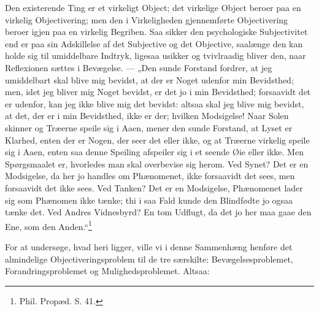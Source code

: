 \documentclass[11pt]{book}
\newcommand{\opage}[1]{\marginnote{\footnotesize\textit{[#1]}}}
\begin{document}
Den existerende Ting er et virkeligt Object; det virkelige Object
beroer paa en virkelig Objectivering; men den i Virkeligheden
gjennemførte Objectivering beroer igjen paa en virkelig Begriben. Saa
sikker den psychologiske Subjectivitet end er paa sin Adskillelse af
det Subjective og det Objective, saalænge den kan holde sig til
umiddelbare Indtryk, ligesaa usikker og tvivlraadig bliver den, naar
Reflexionen sættes i
\opage{172} \setcounter{footnote}{0}%
Bevægelse. --- „Den sunde Forstand fordrer, at jeg umiddelbart skal
blive mig bevidst, at der er Noget udenfor min Bevidsthed; men, idet
jeg bliver mig Noget bevidst, er det jo i min Bevidsthed; forsaavidt
det er udenfor, kan jeg ikke blive mig det bevidst: altsaa skal jeg
blive mig bevidst, at det, der er i min Bevidsthed, ikke er der;
hvilken Modsigelse! Naar Solen skinner og Træerne speile sig i Aaen,
mener den sunde Forstand, at Lyset er Klarhed, enten der er Nogen, der
seer det eller ikke, og at Træerne virkelig speile sig i Aaen, enten
saa denne Speiling afspeiler sig i et seende Øie eller ikke. Men
Spørgsmaalet er, hvorledes man skal overbevise sig herom. Ved Synet?
Det er en Modsigelse, da her jo handles om Phænomenet, ikke forsaavidt
det sees, men forsaavidt det ikke sees. Ved Tanken? Det er en
Modsigelse, Phænomenet lader sig som Phænomen ikke tænke; thi i saa
Fald kunde den Blindfødte jo ogsaa tænke det. Ved Andres Vidnesbyrd?
En tom Udflugt, da det jo her maa gaae den Ene, som den
Anden.“\footnote{Phil. Propæd. S. 41.} %

For at undersøge, hvad heri ligger, ville vi i denne Sammenhæng
henføre det almindelige Objectiveringsproblem til de tre særskilte:
Bevægelsesproblemet, Forandringsproblemet og Mulighedsproblemet.
Altsaa:
\end{document}
